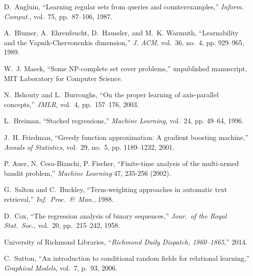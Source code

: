 \documentclass[10pt, conference, compsocconf]{IEEEtran}
\begin{document}
\begin{small}
\begin{thebibliography}{10}
D.~Angluin, ``Learning regular sets from queries and counterexamples,''
  \emph{Inform. Comput.}, vol.~75, pp.~87--106, 1987.

A.~Blumer, A.~Ehrenfeucht, D.~Haussler, and M.~K. Warmuth, ``Learnability and
  the {V}apnik-{C}hervonenkis dimension,'' \emph{J. ACM}, vol.~36, no.~4, pp.
  929--965, 1989.

W.~J. Masek, ``Some {NP}-complete set cover problems,'' unpublished manuscript,
  {MIT} Laboratory for Computer Science.

N.~Bshouty and L.~Burroughs, ``On the proper learning of axis-parallel
  concepts,'' \emph{JMLR}, vol.~4, pp.~157--176, 2003.

L.~Breiman, ``{Stacked regressions},'' \emph{Machine Learning}, vol.~24, pp. 49--64, 1996.

J.~H. Friedman, ``{Greedy function approximation: A gradient boosting
  machine},'' \emph{Annals of Statistics}, vol.~29, no.~5, pp. 1189--1232,
  2001.

P. Auer, N. Cesa-Bianchi, P. Fischer, ``{Finite-time analysis of the multi-armed bandit problem},'' \emph{Machine Learning} 47, 235-256 (2002).

G.~Salton and C.~Buckley, ``{Term-weighting approaches in automatic text
  retrieval},'' \emph{Inf.~Proc.~\&~Man.}, 1988. %

D.~Cox, ``{The regression analysis of binary sequences},'' \emph{Jour.~of the
  Royal Stat.~Soc.}, vol.~20, pp.~215--242, 1958.

{University of Richmond Libraries}, ``{\em {Richmond} {Daily} {Dispatch},
  1860--1865},'' 2014. %

C.~Sutton, ``{An introduction to conditional random fields for relational
  learning},'' \emph{Graphical Models}, vol.~7, p.~93, 2006. %


\end{thebibliography}
\end{small}
\end{document}
